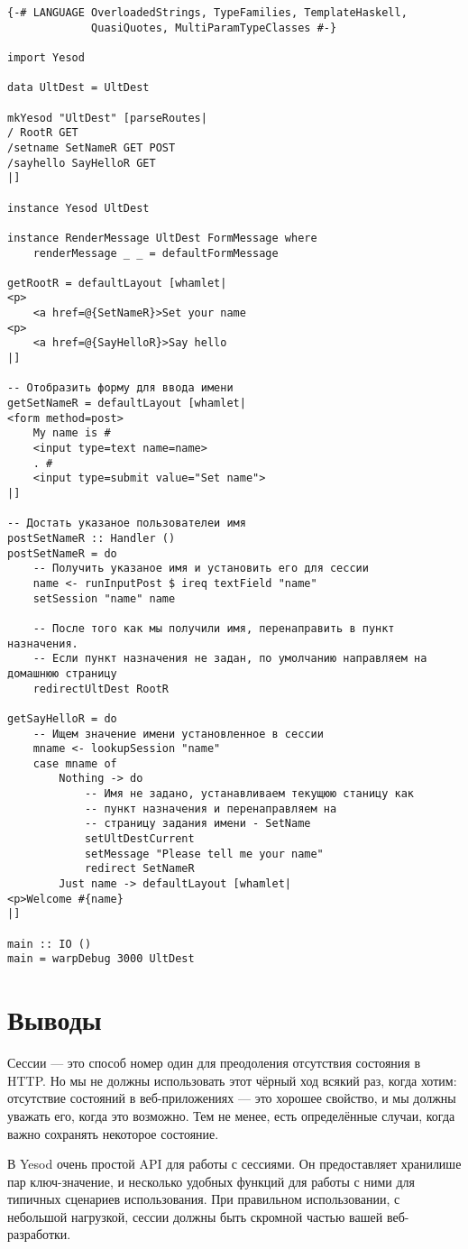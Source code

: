 \begin{lstlisting}
{-# LANGUAGE OverloadedStrings, TypeFamilies, TemplateHaskell,
             QuasiQuotes, MultiParamTypeClasses #-}

import Yesod

data UltDest = UltDest

mkYesod "UltDest" [parseRoutes|
/ RootR GET
/setname SetNameR GET POST
/sayhello SayHelloR GET
|]

instance Yesod UltDest

instance RenderMessage UltDest FormMessage where
    renderMessage _ _ = defaultFormMessage

getRootR = defaultLayout [whamlet|
<p>
    <a href=@{SetNameR}>Set your name
<p>
    <a href=@{SayHelloR}>Say hello
|]

-- Отобразить форму для ввода имени
getSetNameR = defaultLayout [whamlet|
<form method=post>
    My name is #
    <input type=text name=name>
    . #
    <input type=submit value="Set name">
|]

-- Достать указаное пользователеи имя
postSetNameR :: Handler ()
postSetNameR = do
    -- Получить указаное имя и установить его для сессии
    name <- runInputPost $ ireq textField "name"
    setSession "name" name

    -- После того как мы получили имя, перенаправить в пункт назначения.
    -- Если пункт назначения не задан, по умолчанию направляем на домашнюю страницу
    redirectUltDest RootR

getSayHelloR = do
    -- Ищем значение имени установленное в сессии
    mname <- lookupSession "name"
    case mname of
        Nothing -> do
            -- Имя не задано, устанавливаем текущюю станицу как
            -- пункт назначения и перенаправляем на
            -- страницу задания имени - SetName 
            setUltDestCurrent
            setMessage "Please tell me your name"
            redirect SetNameR
        Just name -> defaultLayout [whamlet|
<p>Welcome #{name}
|]

main :: IO ()
main = warpDebug 3000 UltDest
\end{lstlisting}

\section{Выводы}

Сессии --- это способ номер один для преодоления отсутствия состояния в HTTP. Но мы не должны использовать этот чёрный ход всякий раз, когда хотим: отсутствие состояний в веб-приложениях --- это хорошее свойство, и мы должны уважать его, когда это возможно. Тем не менее, есть определённые случаи, когда важно сохранять некоторое состояние. 

В Yesod очень простой API для работы с сессиями. Он предоставляет хранилише пар ключ-значение, и несколько удобных функций для работы с ними для типичных сценариев использования. При правильном использовании, с небольшой нагрузкой, сессии должны быть скромной частью вашей веб-разработки. 
